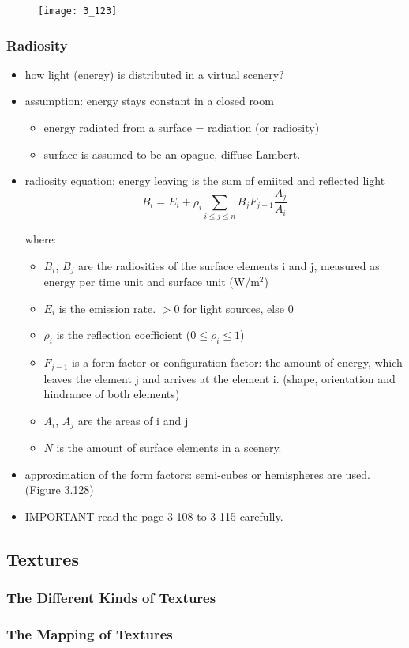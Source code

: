 \documentclass{standalone}
\begin{document}
\begin{figure}[H]
	\texttt{[image: 3\_123]}
\end{figure}


\setcounter{subsubsection}{4}
\subsubsection{Radiosity}

\begin{itemize}
	\item how light (energy) is distributed in a virtual scenery?
	\item assumption: energy stays constant in a closed room 
		\begin{itemize}
			\item energy radiated from a surface = radiation (or radiosity)
			\item surface is assumed to be an opague, diffuse Lambert. 
		\end{itemize}
	\item radiosity equation: energy leaving is the sum of emiited and reflected light
		\begin{equation}
			B_i = E_i + \rho_i \sum_{i \leq j \leq n} B_j F_{j-1} \frac{A_j}{A_i}
		\end{equation}
		
		where:
		
		\begin{itemize}
			\item $B_i$, $B_j$ are the radiosities of the surface elements i and j, measured as energy per time unit and surface unit (W/m$^2$)
			\item $E_i$ is the emission rate. $> 0$ for light sources, else $0$
			\item $\rho_i$ is the reflection coefficient ($0 \leq \rho_i \leq 1$)
			\item $F_{j-1}$ is a form factor or configuration factor: the amount of energy, which leaves the element j and arrives at the element i. (shape, orientation and hindrance of both elements)
			\item $A_i$, $A_j$ are the areas of i and j
			\item $N$ is the amount of surface elements in a scenery.
		\end{itemize}
	\item approximation of the form factors: semi-cubes or hemispheres are used. (Figure 3.128)
	\item IMPORTANT read the page 3-108 to 3-115 carefully.
\end{itemize}

\subsection{Textures}

\subsubsection{The Different Kinds of Textures}

\subsubsection{The Mapping of Textures}
\end{document}
